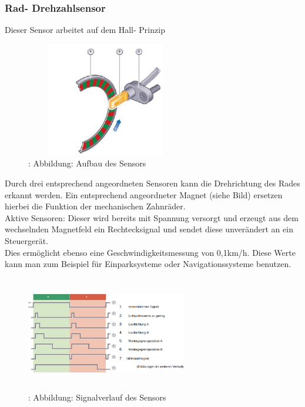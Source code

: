 			
			\subsubsection{Rad- Drehzahlsensor}
			
				Dieser Sensor arbeitet auf dem Hall- Prinzip
				\begin{figure}
					\centering
					\includegraphics[width=7cm, height=5cm] {radsensor.png}
					\caption {\cite{TS26}: Abbildung: Aufbau des Sensors}
				\end{figure}
			
				\begin{flushleft}
					Durch drei entsprechend angeordneten Sensoren kann die Drehrichtung des Rades erkannt werden. Ein entsprechend angeordneter Magnet (siehe Bild) ersetzen hierbei die Funktion der mechanischen Zahnräder.\\
					Aktive Sensoren: Dieser wird bereits mit Spannung versorgt und erzeugt aus dem wechselnden Magnetfeld ein Rechtecksignal und sendet diese unverändert an ein Steuergerät.\\
					Dies ermöglicht ebenso eine Geschwindigkeitsmessung von 0,1km/h. Diese Werte kann man zum Beispiel für Einparksysteme oder Navigationssysteme benutzen.\cite{TS27}
					
				\end{flushleft}

				\begin{figure}
					\centering
					\includegraphics[width=7cm, height=5cm] {signalverlauf_hall.png}
					\caption {\cite{TS28}: Abbildung: Signalverlauf des Sensors}
				\end{figure}

